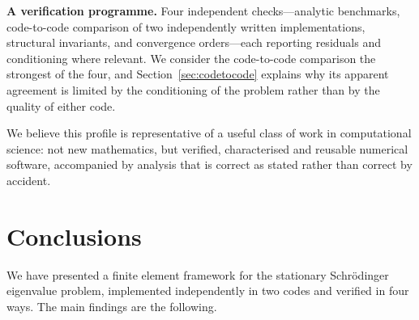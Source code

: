 \documentclass[pdflatex,sn-mathphys-num]{sn-jnl}
\theoremstyle{thmstyleone}%
\theoremstyle{thmstyletwo}%
\theoremstyle{thmstylethree}%
\begin{document}
\textbf{A verification programme.} Four independent checks---analytic
benchmarks, code-to-code comparison of two independently written
implementations, structural invariants, and convergence orders---each reporting
residuals and conditioning where relevant. We consider the code-to-code
comparison the strongest of the four, and
Section~\ref{sec:codetocode} explains why its apparent agreement is limited by
the conditioning of the problem rather than by the quality of either code.

We believe this profile is representative of a useful class of work in
computational science: not new mathematics, but verified, characterised and
reusable numerical software, accompanied by analysis that is correct as stated
rather than correct by accident.

\section{Conclusions}\label{sec:conclusions}

We have presented a finite element framework for the stationary Schr\"odinger
eigenvalue problem, implemented independently in two codes and verified in four
ways. The main findings are the following.
\end{document}

